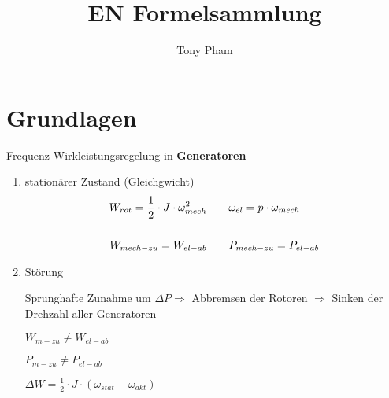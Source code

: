 \documentclass[a4paper,11pt]{article}
\title{EN Formelsammlung}
\author{Tony Pham}
\begin{document}
\maketitle
\tableofcontents
\twocolumn

\section{Grundlagen}
	Frequenz-Wirkleistungsregelung in \textbf{Generatoren}

	\begin{enumerate}
		\item{stationärer Zustand (Gleichgwicht)}
		\begin{align*}
			 W_{rot} = \frac{1}{2} \cdot J \cdot \omega_{mech} ^{2} &\qquad
			 \omega_{el} = p  \cdot \omega_{mech} \\
			 \vspace{1pt}\\
			 W_{mech-zu} = W_{el-ab} &\qquad
			 P_{mech-zu} = P_{el-ab}
		\end{align*}
		
		
		
	
		
		
		\item{Störung}
		
		Sprunghafte Zunahme um $ \Delta P \Rightarrow$ Abbremsen der Rotoren $\Rightarrow$ Sinken der Drehzahl aller Generatoren
		
		$ W_{m-zu} \neq W_{el-ab} $
		
		$ P_{m-zu} \neq P_{el-ab} $
		
		$ \Delta W = \frac{1}{2} \cdot J \cdot (\omega_{stat} - \omega_{akt}) $
		
	\end{enumerate}

	
\end{document}
